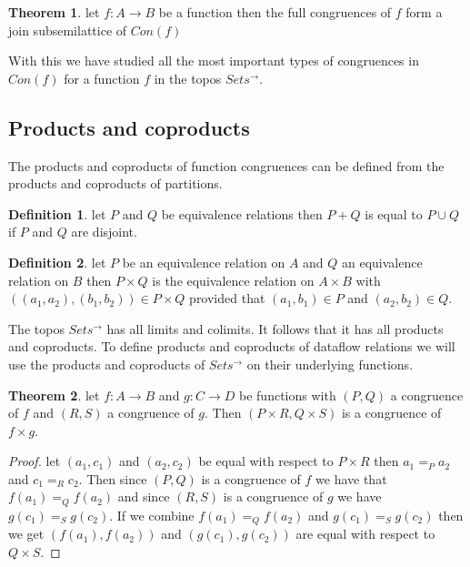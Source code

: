 \documentclass[a4paper,11pt, notitlepage]{report}
\theoremstyle{definition}
\newtheorem{definition}{Definition}[section]
\newtheorem{theorem}{Theorem}[section]
\begin{document}
\begin{theorem}
let $f : A \to B$ be a function then the full congruences of $f$ form a join subsemilattice of $Con(f)$
\end{theorem}

With this we have studied all the most important types of congruences in $Con(f)$ for a function $f$ in the topos $Sets^{\to}$.

\subsection{Products and coproducts}
The products and coproducts of function congruences can be defined from the products and coproducts of partitions.

\begin{definition}
let $P$ and $Q$ be equivalence relations then $P+Q$ is equal to $P \cup Q$ if $P$ and $Q$ are disjoint.
\end{definition}

\begin{definition}
let $P$ be an equivalence relation on $A$ and $Q$ an equivalence relation on $B$ then $P \times Q$ is the equivalence relation on $A \times B$ with $((a_1,a_2), (b_1,b_2)) \in P \times Q$ provided that $(a_1,b_1) \in P$ and $(a_2,b_2) \in Q$.
\end{definition}

The topos $Sets^{\to}$ has all limits and colimits. It follows that it has all products and coproducts. To define products and coproducts of dataflow relations we will use the products and coproducts of $Sets^{\to}$ on their underlying functions.

\begin{theorem}
let $f: A \to B$ and $g: C \to D$ be functions with $(P,Q)$ a congruence of $f$ and $(R,S)$ a congruence of $g$. Then $(P \times R, Q \times S)$ is a congruence of $f \times g$.
\end{theorem}

\begin{proof}
let $(a_1,c_1)$ and $(a_2,c_2)$ be equal with respect to $P \times R$ then $a_1 =_P a_2$ and $c_1 =_R c_2$. Then since $(P,Q)$ is a congruence of $f$ we have that $f(a_1) =_Q f(a_2)$ and since $(R,S)$ is a congruence of $g$ we have $g(c_1) =_S g(c_2)$. If we combine $f(a_1) =_Q f(a_2)$ and $g(c_1) =_S g(c_2)$ then we get $(f(a_1),f(a_2))$ and $(g(c_1),g(c_2))$ are equal with respect to $Q \times S$.
\end{proof}
\end{document}
